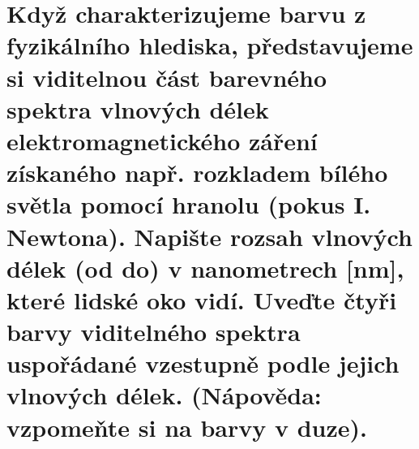 \section{Když charakterizujeme barvu z fyzikálního hlediska, představujeme si viditelnou část barevného spektra vlnových 
délek elektromagnetického záření získaného např. rozkladem bílého světla pomocí hranolu (pokus I. Newtona). Napište 
rozsah vlnových délek (od do) v nanometrech [nm], které lidské oko vidí. Uveďte čtyři barvy viditelného spektra 
uspořádané vzestupně podle jejich vlnových délek. (Nápověda: vzpomeňte si na barvy v duze).}